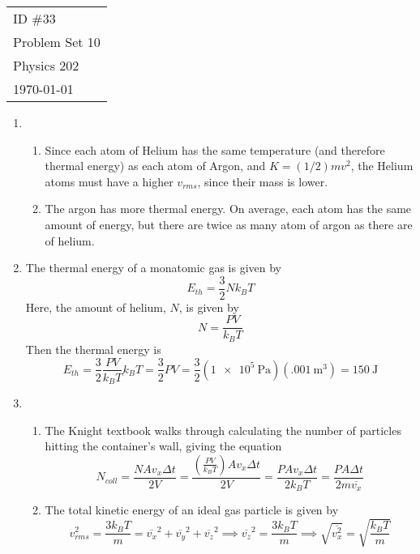 \documentclass[fleqn]{article}[12pt]
\begin{document}
    \begin{tabular}{l}
        ID \#33 \\
        Problem Set 10 \\
        Physics 202 \\
        \today
    \end{tabular}

\begin{enumerate}
    \item \begin{enumerate}
        \item Since each atom of Helium has the same temperature (and therefore thermal energy) as each atom of Argon, and $K=(1/2)mv^2$, the Helium atoms must have a higher $v_{rms}$, since their mass is lower.

        \item The argon has more thermal energy. On average, each atom has the same amount of energy, but there are twice as many atom of argon as there are of helium.
    \end{enumerate}

    \item The thermal energy of a monatomic gas is given by
    \begin{equation*}
        E_{th} = \frac{3}{2}Nk_BT
    \end{equation*}
    Here, the amount of helium, $N$, is given by
    \begin{equation*}
        N = \frac{PV}{k_B T}
    \end{equation*}
    Then the thermal energy is
    \begin{equation*}
        E_{th} = \frac{3}{2}\frac{PV}{k_B T}k_B T = \frac{3}{2} PV = \frac{3}{2} (\SI{1e5}{\pascal})(\SI{.001}{\meter^3}) = \SI{150}{\joule}
    \end{equation*}

    \item \begin{enumerate}
        \item The Knight textbook walks through calculating the number of particles hitting the container's wall, giving the equation
        \begin{equation*}
            N_{coll} = \frac{NAv_x\Delta t}{2 V} = \frac{\left(\frac{PV}{k_B T}\right)Av_x\Delta t}{2 V} =
            \frac{PA v_x \Delta t}{2 k_B T} = \frac{PA\Delta t}{2m\overline{v_x}}
        \end{equation*}

        \item The total kinetic energy of an ideal gas particle is given by
        \begin{equation*}
            v_{rms}^2 = \frac{3k_BT}{m} = \overline{v_x}^2 + \overline{v_y}^2 + \overline{v_z}^2 \implies \overline{v_z}^2 = \frac{3k_BT}{m} \implies \sqrt{\overline{v_x^2}} = \sqrt{\frac{k_BT}{m}}
        \end{equation*}


\end{enumerate}
\end{enumerate}
\end{document}
